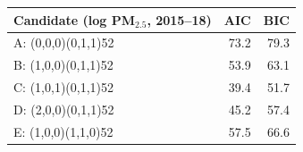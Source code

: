 \begin{tabular}{|l|r|r|}
\hline
\textbf{Candidate (log PM$_{2.5}$, 2015--18)} & \textbf{AIC} & \textbf{BIC} \\\hline
A: (0,0,0)(0,1,1)52 & 73.2 & 79.3 \\\hline
B: (1,0,0)(0,1,1)52 & 53.9 & 63.1 \\\hline
C: (1,0,1)(0,1,1)52 & 39.4 & 51.7 \\\hline
D: (2,0,0)(0,1,1)52 & 45.2 & 57.4 \\\hline
E: (1,0,0)(1,1,0)52 & 57.5 & 66.6 \\\hline
\end{tabular}
